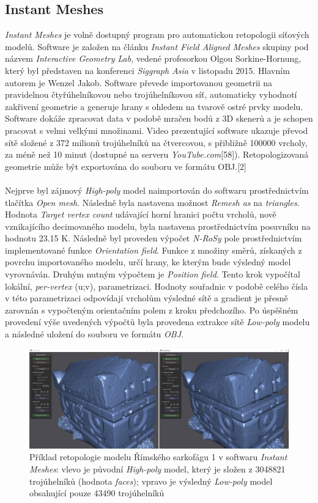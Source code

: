\documentclass[a4paper, 12pt]{report}
\begin{document}
\subsection{Instant Meshes}
\textit{Instant Meshes} je volně dostupný program pro automatickou retopologii síťových modelů. Software je založen na článku \textit{Instant Field Aligned Meshes} skupiny pod názvem \textit{Interactive Geometry Lab}, vedené profesorkou Olgou Sorkine-Hornung, který byl představen na konferenci \textit{Siggraph Asia} v listopadu 2015. Hlavním autorem je Wenzel Jakob. Software převede importovanou geometrii na pravidelnou čtyřúhelníkovou nebo trojúhelníkovou síť, automaticky vyhodnotí zakřivení geometrie a generuje hrany s ohledem na tvarově ostré prvky modelu. Software dokáže zpracovat data v podobě mračen bodů z 3D skenerů a je schopen pracovat s velmi velkými množinami. Video prezentující software ukazuje převod sítě složené z 372 milionů trojúhelníků na čtvercovou, s přibližně 100000 vrcholy, za méně než 10 minut (dostupné na serveru \textit{YouTube.com}[58]). Retopologizovaná geometrie může být exportována do souboru ve formátu OBJ.[2]\\
\\
Nejprve byl zájmový \textit{High-poly} model naimportován do softwaru prostřednictvím tlačítka \textit{Open mesh}. Následně byla nastavena možnost \textit{Remesh as} na \textit{triangles}. Hodnota \textit{Target vertex count} udávající horní hranici počtu vrcholů, nově vznikajícího decimovaného modelu, byla nastavena prostřednictvím posuvníku na hodnotu 23.15 K. Následně byl proveden výpočet \textit{N-RoSy} pole prostřednictvím implementované funkce \textit{Orientation field}. Funkce z množiny směrů, získaných z povrchu importovaného modelu, určí hrany, ke kterým bude výsledný model vyrovnáván. Druhým nutným výpočtem je \textit{Position field}. Tento krok vypočítal lokální, \textit{per-vertex} (u;v), parametrizaci. Hodnoty souřadnic v podobě celého čísla v této parametrizaci odpovídají vrcholům výsledné sítě a gradient je přesně zarovnán s vypočteným orientačním polem z kroku předchozího. Po úspěšném provedení výše uvedených výpočtů byla provedena extrakce sítě \textit{Low-poly} modelu a následné uložení do souboru ve formátu \textit{OBJ}.

\begin{figure}[h!]
	\centering
	\includegraphics[width=16cm]{IM.jpg}
	\caption{Příklad retopologie modelu Římského sarkofágu 1 v softwaru \textit{Instant Meshes}: vlevo je původní \textit{High-poly} model, který je složen z 3048821 trojúhelníků (hodnota \textit{faces}); vpravo je výsledný \textit{Low-poly} model obsahující pouze 43490 trojúhelníků}
\end{figure}
\end{document}

